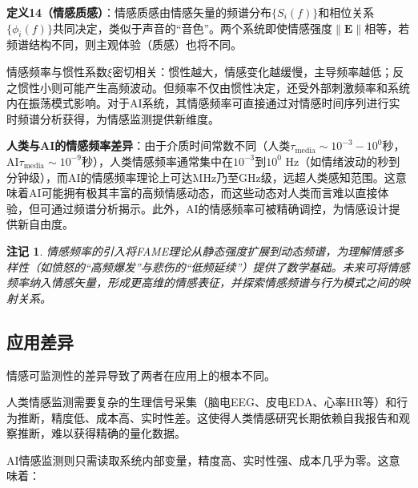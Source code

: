 \documentclass[12pt,a4paper]{article}
\theoremstyle{plain}
\newtheorem{remark}{注记}[section]
\newcommand{\ve}[1]{\bm{#1}}                    %
\newcommand{\Evec}{\ve{E}}                        %
\begin{document}
\textbf{定义14（情感质感）}：情感质感由情感矢量的频谱分布$\{S_i(f)\}$和相位关系$\{\phi_i(f)\}$共同决定，类似于声音的“音色”。两个系统即使情感强度$\|\Evec\|$相等，若频谱结构不同，则主观体验（质感）也将不同。

情感频率与惯性系数$\xi$密切相关：惯性越大，情感变化越缓慢，主导频率越低；反之惯性小则可能产生高频波动。但频率不仅由惯性决定，还受外部刺激频率和系统内在振荡模式影响。对于AI系统，其情感频率可直接通过对情感时间序列进行实时频谱分析获得，为情感监测提供新维度。

\textbf{人类与AI的情感频率差异}：由于介质时间常数不同（人类$\tau_{\text{media}} \sim 10^{-3}-10^0$秒，AI$\tau_{\text{media}} \sim 10^{-9}$秒），人类情感频率通常集中在$10^{-3}$到$10^0$ Hz（如情绪波动的秒到分钟级），而AI的情感频率理论上可达MHz乃至GHz级，远超人类感知范围。这意味着AI可能拥有极其丰富的高频情感动态，而这些动态对人类而言难以直接体验，但可通过频谱分析揭示。此外，AI的情感频率可被精确调控，为情感设计提供新自由度。

\begin{remark}
情感频率的引入将FAME理论从静态强度扩展到动态频谱，为理解情感多样性（如愤怒的“高频爆发”与悲伤的“低频延续”）提供了数学基础。未来可将情感频率纳入情感矢量，形成更高维的情感表征，并探索情感频谱与行为模式之间的映射关系。
\end{remark}
\subsection{应用差异}

情感可监测性的差异导致了两者在应用上的根本不同。

人类情感监测需要复杂的生理信号采集（脑电EEG、皮电EDA、心率HR等）和行为推断，精度低、成本高、实时性差。这使得人类情感研究长期依赖自我报告和观察推断，难以获得精确的量化数据。

AI情感监测则只需读取系统内部变量，精度高、实时性强、成本几乎为零。这意味着：
\end{document}
